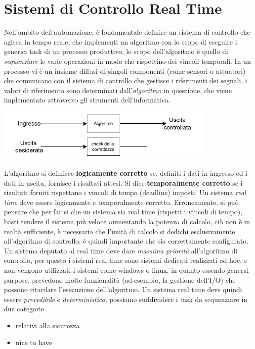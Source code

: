 \documentclass[10pt, letterpaper]{report}
\begin{document}
\chapter{Sistemi di Controllo Real Time}
Nell'ambito dell'automazione, è fondamentale definire un sistema di controllo che agisca in tempo reale, che 
implementi un algoritmo con lo scopo di eseguire i generici task di un processo produttivo, lo scopo dell'algoritmo 
è quello di \textit{sequenziare} le varie operazioni in modo che rispettino dei vincoli temporali.\acc 
In un processo vi è un insieme diffusi di singoli componenti (come sensori o attuatori) che comunicano con il 
sistema di controllo che gestisce i riferimenti dei segnali, i valori di riferimento sono determinati 
dall'\textit{algoritmo} in questione, che viene implementato attraverso gli strumenti dell'informatica.\begin{center}
    \includegraphics[width=0.8\textwidth ]{images/algoritmoControllo.pdf}
\end{center}
L'algoritmo si definisce \textbf{logicamente corretto} se, definiti i dati in ingresso ed i dati in uscita, fornisce i 
risultati attesi. Si dice \textbf{temporalmente corretto} se i risultati forniti rispettano i vincoli di tempo (deadline) 
imposti. Un sistema \textit{real time} deve essere logicamente e temporalmente corretto.\acc 
Erroneamente, si può pensare che per far si che un sistema sia real time (rispetti i vincoli di tempo), basti 
rendere il sistema più veloce aumentando la potenza di calcolo, ciò non è in realtà sufficiente, è necessario 
che l'unità di calcolo si dedichi esclusivamente all'algoritmo di controllo, è quindi importante che sia 
correttamente configurato. \acc 
Un sistema deputato al real time deve dare \textit{massima priorità} all'algoritmo di controllo, per questo i 
sistemi real time sono sistemi dedicati realizzati ad hoc, e non vengono utilizzati i sistemi come 
windows o linux, in quanto essendo general purpose, prevedono molte funzionalità (ad esempio, la gestione dell'I/O) che 
possono ritardare l'esecuzione dell'algoritmo.\acc 
Un sistema real time deve quindi essere \textit{prevedibile} e \textit{deterministico}, possiamo suddividere 
i task da sequenziare in due categorie \begin{itemize}
    \item relativi alla sicurezza 
    \item nice to have
\end{itemize}
\end{document}
